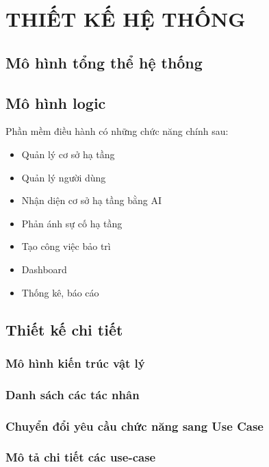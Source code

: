 \section{THIẾT KẾ HỆ THỐNG}
\subsection{Mô hình tổng thể hệ thống}

\subsection{Mô hình logic}

Phần mềm điều hành có những chức năng chính sau:
\begin{itemize}
   
 \item  Quản lý cơ sở hạ tầng
 \item  Quản lý người dùng
 \item  Nhận diện cơ sở hạ tầng bằng AI
 \item  Phản ánh sự cố hạ tầng
 \item  Tạo công việc bảo trì
 \item  Dashboard
 \item  Thống kê, báo cáo
\end{itemize}
\subsection{Thiết kế chi tiết}
\subsubsection{Mô hình kiến trúc vật lý}

\cleardoublepage
\subsubsection{Danh sách các tác nhân}

\subsubsection{Chuyển đổi yêu cầu chức năng sang Use Case}

\cleardoublepage
\subsubsection{Mô tả chi tiết các use-case}




